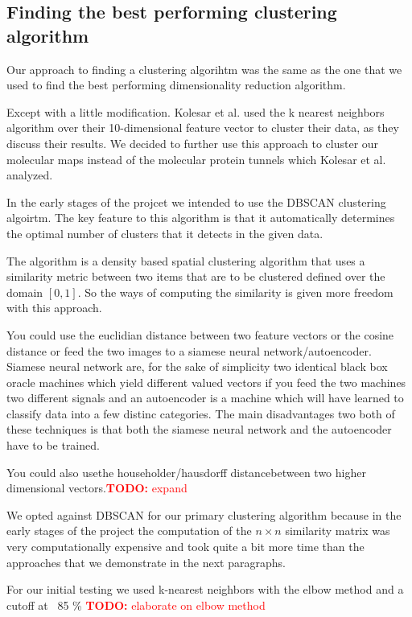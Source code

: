 \documentclass[journal]{vgtc}       %
\newcommand{\todo}[1]{\textcolor{red}{\textbf{TODO:} #1}}
\begin{document}
\subsection{Finding the best performing clustering algorithm}
Our approach to finding a clustering algorihtm was the same as the one that we used  to find the best performing dimensionality reduction algorithm.

Except with a little modification. Kolesar et al. \cite{kolesar} used the k nearest neighbors algorithm over their 10-dimensional feature vector to cluster their data, as they discuss their results. We decided to further use this approach to cluster our molecular maps instead of the molecular protein tunnels which Kolesar et al. analyzed.


In the early stages of the projcet we intended to use the DBSCAN clustering algoirtm. 
The key feature to this algorithm is that it automatically determines the optimal number of clusters that it detects in the given data. 

The algorithm is a density based spatial clustering algorithm that uses a similarity metric between two items that are to be  clustered defined over the domain \([0,1]\). So the ways of computing the similarity is given more freedom with this approach.


You could use the euclidian distance between two feature vectors or the cosine distance or feed the two images to a siamese neural network/autoencoder. Siamese neural network are, for the sake of simplicity two identical black box oracle machines which yield different valued vectors if you feed the two machines two different signals and  an autoencoder is a machine which will have learned to classify data into a few distinc categories. The main disadvantages two both of these techniques is that both the siamese neural network and the autoencoder have to be trained.

You could also usethe householder/hausdorff distancebetween two higher dimensional vectors.\todo{expand}

We opted against DBSCAN for our primary clustering algorithm because in the early stages of the project the computation of the \(n\times n\) similarity matrix was very computationally expensive and took quite a bit more time than the approaches that we demonstrate in the next paragraphs.


For our initial testing we used k-nearest neighbors with the elbow method and a cutoff at  ~85 \% \todo{elaborate on elbow method}
\end{document}
